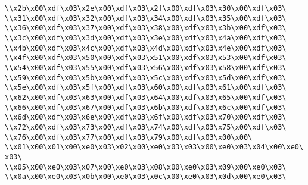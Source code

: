 \verb|\\x2b\x00\xdf\x03\x2e\x00\xdf\x03\x2f\x00\xdf\x03\x30\x00\xdf\x03\|\newline
\verb|\\x31\x00\xdf\x03\x32\x00\xdf\x03\x34\x00\xdf\x03\x35\x00\xdf\x03\|\newline
\verb|\\x36\x00\xdf\x03\x37\x00\xdf\x03\x38\x00\xdf\x03\x3b\x00\xdf\x03\|\newline
\verb|\\x3c\x00\xdf\x03\x3d\x00\xdf\x03\x3e\x00\xdf\x03\x4a\x00\xdf\x03\|\newline
\verb|\\x4b\x00\xdf\x03\x4c\x00\xdf\x03\x4d\x00\xdf\x03\x4e\x00\xdf\x03\|\newline
\verb|\\x4f\x00\xdf\x03\x50\x00\xdf\x03\x51\x00\xdf\x03\x53\x00\xdf\x03\|\newline
\verb|\\x54\x00\xdf\x03\x55\x00\xdf\x03\x56\x00\xdf\x03\x58\x00\xdf\x03\|\newline
\verb|\\x59\x00\xdf\x03\x5b\x00\xdf\x03\x5c\x00\xdf\x03\x5d\x00\xdf\x03\|\newline
\verb|\\x5e\x00\xdf\x03\x5f\x00\xdf\x03\x60\x00\xdf\x03\x61\x00\xdf\x03\|\newline
\verb|\\x62\x00\xdf\x03\x63\x00\xdf\x03\x64\x00\xdf\x03\x65\x00\xdf\x03\|\newline
\verb|\\x66\x00\xdf\x03\x67\x00\xdf\x03\x6b\x00\xdf\x03\x6c\x00\xdf\x03\|\newline
\verb|\\x6d\x00\xdf\x03\x6e\x00\xdf\x03\x6f\x00\xdf\x03\x70\x00\xdf\x03\|\newline
\verb|\\x72\x00\xdf\x03\x73\x00\xdf\x03\x74\x00\xdf\x03\x75\x00\xdf\x03\|\newline
\verb|\\x76\x00\xdf\x03\x77\x00\xdf\x03\x79\x00\xdf\x03\x00\x00\|\newline
\verb|\\x01\x00\x01\x00\xe0\x03\x02\x00\xe0\x03\x03\x00\xe0\x03\x04\x00\xe0\x03\|\newline
\verb|\\x05\x00\xe0\x03\x07\x00\xe0\x03\x08\x00\xe0\x03\x09\x00\xe0\x03\|\newline
\verb|\\x0a\x00\xe0\x03\x0b\x00\xe0\x03\x0c\x00\xe0\x03\x0d\x00\xe0\x03\|\newline
